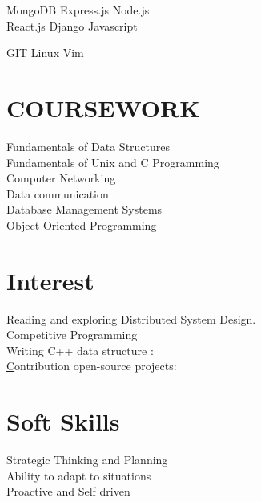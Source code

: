 \documentclass[]{deedy-resume-openfont}
\begin{document}
\begin{minipage}[t]{0.33\textwidth}
 \textbullet{} MongoDB 
\textbullet{}Express.js \textbullet{} Node.js \\
\textbullet{} React.js
 \textbullet{} Django \textbullet{} Javascript
 
 \textbullet{} GIT \textbullet{}Linux \textbullet{}Vim
\sectionsep


\section{COURSEWORK}
\textbullet{}Fundamentals of Data Structures\\
\textbullet{}Fundamentals of Unix and C
 Programming \\
\textbullet{}Computer Networking\\
\textbullet{}Data communication \\
\textbullet{}Database Management Systems\\
\textbullet{}Object Oriented Programming\\



\section{Interest}
\textbullet{}Reading and exploring Distributed System Design.\\
\textbullet{}Competitive Programming\\
\textbullet{}Writing C++ data structure : \href{https://github.com/llucifer97/Algorithms-Datastructure}{}\\
\textbullet{}\href{}Contribution open-source projects: \href{https://github.com/pulls?q=is%3Apr+author%3Allucifer97+archived%3Afalse+is%3Aclosed}{\custombold{Link}}\\



 \section{Soft Skills}
 \textbullet{}Strategic Thinking and Planning\\
\textbullet{}Ability to adapt to situations\\
 \textbullet{}Proactive and Self driven
 \sectionsep
%
%

\end{minipage} 
\end{document}
